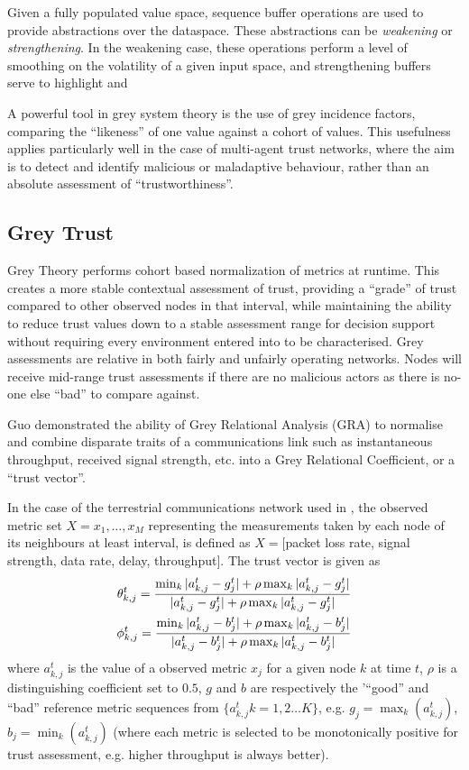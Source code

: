 
Given a fully populated value space, sequence buffer operations are used to provide abstractions over the dataspace.
These abstractions can be \emph{weakening} or \emph{strengthening}.
In the weakening case, these operations perform a level of smoothing on the volatility of a given input space, and strengthening buffers serve to highlight and 

A powerful tool in grey system theory is the use of grey incidence factors, comparing the ``likeness'' of one value against a cohort of values.
This usefulness applies particularly well in the case of multi-agent trust networks, where the aim is to detect and identify malicious or maladaptive behaviour, rather than an absolute assessment of ``trustworthiness''.

\subsection{Grey Trust}

Grey Theory performs cohort based normalization of metrics at runtime. 
This creates a more stable contextual assessment of trust, providing a ``grade'' of trust compared to other observed nodes in that interval, while maintaining the ability to reduce trust values down to a stable assessment range for decision support without requiring every environment entered into to be characterised.
Grey assessments are relative in both fairly and unfairly operating networks.
Nodes will receive mid-range trust assessments if there are no malicious actors as there is no-one else ``bad'' to compare against.

Guo\cite{Guo11} demonstrated the ability of Grey Relational Analysis (GRA)\cite{Zuo1995} to normalise and combine disparate traits of a communications link such as instantaneous throughput, received signal strength, etc. into a Grey Relational Coefficient, or a ``trust vector''.

In the case of the terrestrial communications network used in \cite{Guo11}, the observed metric set $X = {x_1,\dots,x_M}$ representing the measurements taken by each node of its neighbours at least interval, is defined as $X=[$packet loss rate, signal strength, data rate, delay, throughput$]$.
The trust vector is given as
%
\begin{align}
  \label{eq:grc}
  \theta_{k,j}^t = \frac{\min_k|a_{k,j}^t - g_j^t| + \rho \max_k|a_{k,j}^t-g_j^t|}{|a_{k,j}^t-g_j^t| + \rho \max_k|a_{k,j}^t-g_j^t|} \\
  \phi_{k,j}^t = \frac{\min_k|a_{k,j}^t - b_j^t| + \rho \max_k|a_{k,j}^t-b_j^t|}{|a_{k,j}^t-b_j^t| + \rho \max_k|a_{k,j}^t-b_j^t|} \notag 
\end{align}
%
where $a_{k,j}^t$ is the value of a observed metric $x_j$ for a given node $k$ at time $t$, $\rho$ is a distinguishing coefficient set to $0.5$, $g$ and $b$ are respectively the '``good'' and ``bad'' reference metric sequences from $\{a_{k,j}^t k=1,2\dots K\}$, e.g. $g_j=\max_k({a_{k,j}^t})$,  $b_j=\min_k({a_{k,j}^t})$ (where each metric is selected to be monotonically positive for trust assessment, e.g. higher throughput is always better). 

